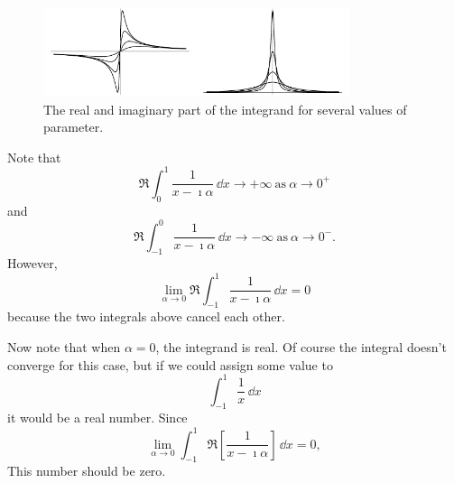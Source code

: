 {\begin{Solution}
  \begin{figure}[tb!]
    \begin{center}
      \includegraphics[width=0.8\textwidth]{fcv/residue/cpv_rii}
    \end{center}
    \caption{The real and imaginary part of the integrand for several values 
      of parameter.}
    \label{cpv_rii}
  \end{figure}

  Note that 
  \[
  \Re \int_0^1 \frac{1}{x - \imath \alpha} \,\dd x \to +\infty\ \mathrm{as}\ \alpha \to 0^+
  \]
  and
  \[
  \Re \int_{-1}^0 \frac{1}{x - \imath \alpha} \,\dd x \to -\infty\ \mathrm{as}\ \alpha \to 0^-.
  \]
  However,
  \[
  \lim_{\alpha \to 0} \Re \int_{-1}^1 \frac{1}{x - \imath \alpha} \,\dd x = 0
  \]
  because the two integrals above cancel each other.

  Now note that when $\alpha = 0$, the integrand is real.  Of course the 
  integral doesn't converge for this case, but if we could assign some 
  value to 
  \[
  \int_{-1}^1 \frac{1}{x} \,\dd x
  \]
  it would be a real number.  Since
  \[
  \lim_{\alpha \to 0} \int_{-1}^1 \Re \left[ \frac{1}{x - \imath \alpha} \right] \,\dd x
  = 0,
  \]
  This number should be zero.
\end{Solution}








}
